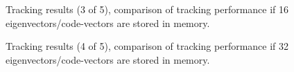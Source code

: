 \begin{figure}[t]
\centering

\caption{Tracking results (3 of 5), comparison of tracking performance if 16 eigenvectors/code-vectors are stored in memory.}
\label{fig:results_final_3_16}
\end{figure}


\begin{figure}[t]
\centering

\caption{Tracking results (4 of 5), comparison of tracking performance if 32 eigenvectors/code-vectors are stored in memory.}
\label{fig:results_final_4_32}
\end{figure}


